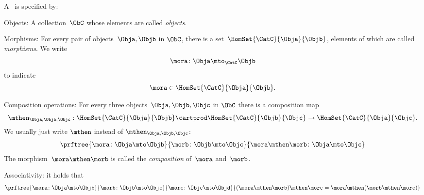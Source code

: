 \begin{ctdefinition}[Semicategory]
    \label{def:semicategory-compact}
    A \emph{}~\CatC is specified by:
    \begin{body}
        \constit
        \begin{compactenum}
            \item Objects: A collection\footnotemark~$\ObC$ whose elements are called \emph{objects}.
            \item Morphisms: For every pair of objects~$\Obja,\Objb$ in $\ObC$, there is a set~$\HomSet{\CatC}{\Obja}{\Objb}$, elements of which are called \emph{morphisms}.
            We write
            \begin{equation}
                \mora \colon \Obja \mto_\CatC \Objb
            \end{equation}
            to indicate
            \begin{equation}
                \mora \in \HomSet{\CatC}{\Obja}{\Objb}.
            \end{equation}
            \item Composition operations: For every three objects~$\Obja,\Objb,\Objc$ in $\ObC$ there is a composition map
            \begin{equation}
                \mthen_{\Obja,\Objb,\Objc}: \HomSet{\CatC}{\Obja}{\Objb} \cartprod \HomSet{\CatC}{\Objb}{\Objc}\to \HomSet{\CatC}{\Obja}{\Objc}.
            \end{equation}
            We usually just write $\mthen$ instead of $\mthen_{\Obja,\Objb,\Objc}$:
            \begin{equation}
                \prftree{\mora \colon \Obja \mto \Objb}{\morb\colon \Objb \mto \Objc}{\mora \mthen \morb \colon \Obja \mto \Objc}
            \end{equation}
            The morphism~$\mora \mthen \morb$ is called the \emph{composition} of~$\mora$ and~$\morb$.
        \end{compactenum}
        \condit
        \begin{compactenum}
            \item Associativity: it holds that
            \begin{equation}
                \prftree{\mora\colon \Obja \mto \Objb}{\morb\colon \Objb \mto \Objc}{\morc\colon \Objc \mto \Objd}
                {
                    (\mora\mthen \morb)
                    \mthen \morc= \mora \mthen (\morb \mthen \morc)
                }
            \end{equation}
        \end{compactenum}
    \end{body}
\end{ctdefinition}

